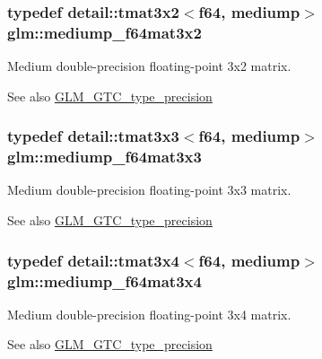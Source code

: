 \subsubsection[{\texorpdfstring{mediump\+\_\+f64mat3x2}{mediump_f64mat3x2}}]{\setlength{\rightskip}{0pt plus 5cm}typedef detail\+::tmat3x2$<$f64, mediump$>$ {\bf glm\+::mediump\+\_\+f64mat3x2}}\hypertarget{group__gtc__type__precision_gad6408472435fce994a3bb9d14d321ddd}{}\label{group__gtc__type__precision_gad6408472435fce994a3bb9d14d321ddd}
Medium double-\/precision floating-\/point 3x2 matrix. \begin{DoxySeeAlso}{See also}
\hyperlink{group__gtc__type__precision}{G\+L\+M\+\_\+\+G\+T\+C\+\_\+type\+\_\+precision} 
\end{DoxySeeAlso}
\subsubsection[{\texorpdfstring{mediump\+\_\+f64mat3x3}{mediump_f64mat3x3}}]{\setlength{\rightskip}{0pt plus 5cm}typedef detail\+::tmat3x3$<$f64, mediump$>$ {\bf glm\+::mediump\+\_\+f64mat3x3}}\hypertarget{group__gtc__type__precision_ga871b69a221dae7461aa746e6e6d372fc}{}\label{group__gtc__type__precision_ga871b69a221dae7461aa746e6e6d372fc}
Medium double-\/precision floating-\/point 3x3 matrix. \begin{DoxySeeAlso}{See also}
\hyperlink{group__gtc__type__precision}{G\+L\+M\+\_\+\+G\+T\+C\+\_\+type\+\_\+precision} 
\end{DoxySeeAlso}
\subsubsection[{\texorpdfstring{mediump\+\_\+f64mat3x4}{mediump_f64mat3x4}}]{\setlength{\rightskip}{0pt plus 5cm}typedef detail\+::tmat3x4$<$f64, mediump$>$ {\bf glm\+::mediump\+\_\+f64mat3x4}}\hypertarget{group__gtc__type__precision_gac3b0ca6d79631a2480cee8897dcd79ec}{}\label{group__gtc__type__precision_gac3b0ca6d79631a2480cee8897dcd79ec}
Medium double-\/precision floating-\/point 3x4 matrix. \begin{DoxySeeAlso}{See also}
\hyperlink{group__gtc__type__precision}{G\+L\+M\+\_\+\+G\+T\+C\+\_\+type\+\_\+precision} 
\end{DoxySeeAlso}
